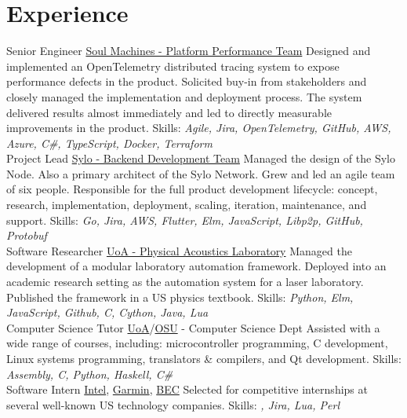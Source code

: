 \documentclass[a4paper]{twentysecondcv}
\begin{document}
\makeprofile{}

\section{Experience}
\begin{twenty}
    {}
    {Senior Engineer}
    {\href{https://www.soulmachines.com/}{Soul Machines - Platform Performance Team}}
    {}
    {Designed and implemented an OpenTelemetry distributed tracing system to
    expose performance defects in the product. Solicited buy-in from
    stakeholders and closely managed the implementation and deployment process.
    The system delivered results almost immediately and led to directly
    measurable improvements in the product.
    Skills: \emph{Agile, Jira, OpenTelemetry, GitHub, AWS, Azure, C\#,
    TypeScript, Docker, Terraform}} \\

    {}
    {Project Lead}
    {\href{https://sylo.io/}{Sylo - Backend Development Team}}
    {}
    {Managed the design of the Sylo Node. Also a primary architect of the Sylo
    Network. Grew and led an agile team of six people. Responsible for the full
    product development lifecycle: concept, research, implementation,
    deployment, scaling, iteration, maintenance, and support.
    Skills: \emph{Go, Jira, AWS, Flutter, Elm, JavaScript, Libp2p, GitHub,
    Protobuf}} \\

    {}
    {Software Researcher}
    {\href{https://pal.auckland.ac.nz/}{UoA - Physical Acoustics Laboratory}}
    {}
    {Managed the development of a modular laboratory automation framework.
    Deployed into an academic research setting as the automation system for a
    laser laboratory. Published the framework in a US physics textbook.
    Skills: \emph{Python, Elm, JavaScript, Github, C, Cython, Java, Lua}} \\

    {}
    {Computer Science Tutor}
    {\href{http://www.auckland.ac.nz/}{UoA}/\href{http://www.oregonstate.edu/}{OSU} - Computer Science Dept}
    {}
    {Assisted with a wide range of courses, including: microcontroller
    programming, C development, Linux systems programming, translators
    \& compilers, and Qt development.
    Skills: \emph{Assembly, C, Python, Haskell, C\#}} \\

    {}
    {Software Intern}
    {\href{https://www.intel.com}{Intel},
    \href{http://www.garmin.com}{Garmin},
    \href{https://www.becpdx.org/}{BEC}}
    {}
    {Selected for competitive internships at several well-known US technology
    companies.
    Skills: \emph{\CC, Jira, Lua, Perl}} \\


\end{twenty}
\end{document}
